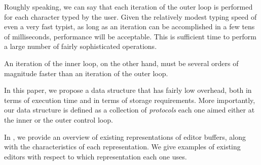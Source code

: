 Roughly speaking, we can say that each iteration of the outer loop is
performed for each character typed by the user.  Given the relatively
modest typing speed of even a very fast typist, as long as an
iteration can be accomplished in a few tens of milliseconds,
performance will be acceptable.  This is sufficient time to perform a
large number of fairly sophisticated operations.

An iteration of the inner loop, on the other hand, must be several
orders of magnitude faster than an iteration of the outer loop.

In this paper, we propose a data structure that has fairly low
overhead, both in terms of execution time and in terms of storage
requirements.  More importantly, our data structure is defined as a
collection of \clos{} \emph{protocols} each one aimed either at the
inner or the outer control loop.

In , we provide an overview of existing
representations of editor buffers, along with the characteristics of
each representation.  We give examples of existing editors with
respect to which representation each one uses.


